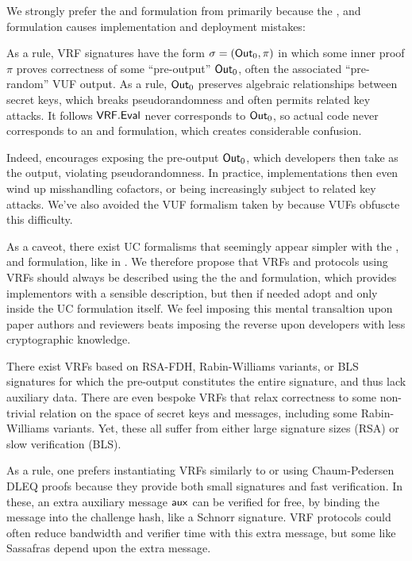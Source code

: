 We strongly prefer the \Sign and \Verify formulation from \cite{agg_dkg}
primarily because the , and 
formulation causes implementation and deployment mistakes:

As a rule, VRF signatures have the form $\sigma = ({\mathsf{Out}}_0,\pi)$ in which
some inner proof $\pi$ proves correctness of some ``pre-output'' ${\mathsf{Out}}_0$,
 often the associated ``pre-random'' VUF output.
As a rule, ${\mathsf{Out}}_0$ preserves algebraic relationships between secret keys,
 which breaks pseudorandomness and often permits related key attacks.
It follows ${\mathsf{VRF}}.{\mathsf{Eval}}$ never corresponds to ${\mathsf{Out}}_0$, so actual code never
corresponds to an  and  formulation,
 which creates considerable confusion.

Indeed,  encourages exposing the pre-output ${\mathsf{Out}}_0$,
which developers then take as the output, violating pseudorandomness. 
In practice, implementations then even wind up misshandling cofactors,
 or being increasingly subject to related key attacks.
We've also avoided the VUF formalism taken by \cite{agg_dkg} because VUFs obfuscte this difficulty.

As a caveot, there exist UC formalisms that seemingly appear simpler
with the , and  formulation,
like in \cite{Praos}.
We therefore propose that VRFs and protocols using VRFs should always be
described using the the \Sign and \Verify formulation, which provides
implementors with a sensible description, but then if needed adopt
  and  only inside the UC formulation itself.
We feel imposing this mental transaltion upon paper authors and reviewers
 beats imposing the reverse upon developers with less cryptographic knowledge.

\smallskip

There exist VRFs based on RSA-FDH, Rabin-Williams variants, or BLS
signatures for which the pre-output constitutes the entire signature,
and thus lack auxiliary data. 
There are even bespoke VRFs that relax correctness to some non-trivial relation
on the space of secret keys and messages, including some Rabin-Williams variants. 
Yet, these all suffer from either large signature sizes (RSA) or
 slow verification (BLS).

As a rule, one prefers instantiating VRFs similarly to
 \cite{nsec5} or \cite{VXEd25519} using Chaum-Pedersen DLEQ proofs \cite{CP93}
 because they provide both small signatures and fast verification.
In these, an extra auxiliary message $\mathsf{aux}$ can be verified for free,
by binding the message into the challenge hash, like a Schnorr signature.
VRF protocols could often reduce bandwidth and verifier time with
this extra message, but some like Sassafras depend upon the extra message.



